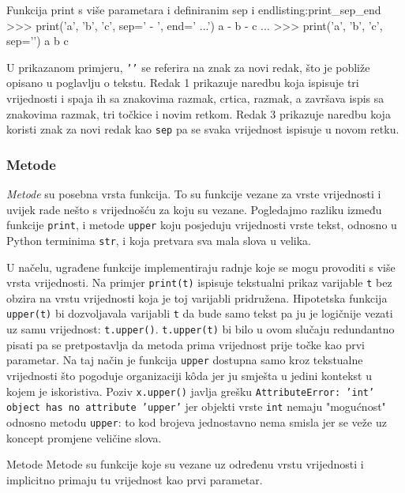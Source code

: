 \begin{python}{Funkcija print s više parametara i definiranim sep i end}{listing:print_sep_end}
>>> print('a', 'b', 'c', sep=' - ', end=' ...\n')
a - b - c ...
>>> print('a', 'b', 'c', sep='\n')
a
b
c
\end{python}

U prikazanom primjeru, \texttt{'\n'} se referira na znak za novi redak, što je pobliže opisano u poglavlju o tekstu. Redak 1 prikazuje naredbu koja ispisuje tri vrijednosti i spaja ih sa znakovima razmak, crtica, razmak, a završava ispis sa znakovima razmak, tri točkice i novim retkom. Redak 3 prikazuje naredbu koja koristi znak za novi redak kao \texttt{sep} pa se svaka vrijednost ispisuje u novom retku.

\subsubsection{Metode}

\textit{Metode} su posebna vrsta funkcija. To su funkcije vezane za vrste vrijednosti i uvijek rade nešto s vrijednošću za koju su vezane. Pogledajmo razliku između funkcije \texttt{print}, i metode \texttt{upper} koju posjeduju vrijednosti vrste tekst, odnosno u Python terminima \texttt{str}, i koja pretvara sva mala slova u velika.


U načelu, ugrađene funkcije implementiraju radnje koje se mogu provoditi s više vrsta vrijednosti. Na primjer \texttt{print(t)} ispisuje tekstualni prikaz varijable \texttt{t} bez obzira na vrstu vrijednosti koja je toj varijabli pridružena. Hipotetska funkcija \texttt{upper(t)} bi dozvoljavala varijabli \texttt{t} da bude samo tekst pa ju je logičnije vezati uz samu vrijednost: \texttt{t.upper()}. \texttt{t.upper(t)} bi bilo u ovom slučaju redundantno pisati pa se pretpostavlja da metoda prima vrijednost prije točke kao prvi parametar. Na taj način je funkcija \texttt{upper} dostupna samo kroz tekstualne vrijednosti što pogoduje organizaciji kôda jer ju smješta u jedini kontekst u kojem je iskoristiva. Poziv \texttt{x.upper()} javlja grešku \texttt{AttributeError: 'int' object has no attribute 'upper'} jer objekti vrste \texttt{int} nemaju "mogućnost" odnosno metodu \texttt{upper}: to kod brojeva jednostavno nema smisla jer se veže uz koncept promjene veličine slova.

\begin{important}{Metode}
Metode su funkcije koje su vezane uz određenu vrstu vrijednosti i implicitno primaju tu vrijednost kao prvi parametar.
\end{important}
